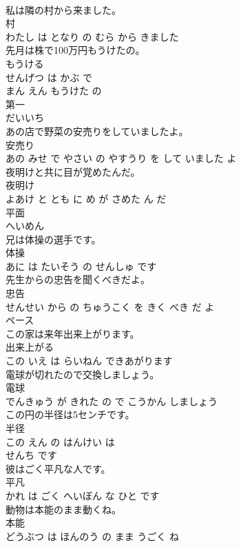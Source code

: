 \documentclass[8pt]{extreport}
\begin{document}
\begin{CJK}{UTF8}{min}
\\	私は隣の村から来ました。	
\\	村 
\\	わたし は となり の むら から きました			
\\	先月は株で100万円もうけたの。	
\\	もうける 
\\	せんげつ は かぶ で 
\\	まん えん もうけた の			
\\	第一	
\\	だいいち			
\\	あの店で野菜の安売りをしていましたよ。	
\\	安売り 
\\	あの みせ で やさい の やすうり を して いました よ			
\\	夜明けと共に目が覚めたんだ。	
\\	夜明け 
\\	よあけ と とも に め が さめた ん だ			
\\	平面	
\\	へいめん			
\\	兄は体操の選手です。	
\\	体操 
\\	あに は たいそう の せんしゅ です			
\\	先生からの忠告を聞くべきだよ。	
\\	忠告 
\\	せんせい から の ちゅうこく を きく べき だ よ			
\\	ペース	
\\	この家は来年出来上がります。	
\\	出来上がる 
\\	この いえ は らいねん できあがります			
\\	電球が切れたので交換しましょう。	
\\	電球 
\\	でんきゅう が きれた の で こうかん しましょう			
\\	この円の半径は5センチです。	
\\	半径 
\\	この えん の はんけい は 
\\	せんち です			
\\	彼はごく平凡な人です。	
\\	平凡 
\\	かれ は ごく へいぼん な ひと です			
\\	動物は本能のまま動くね。	
\\	本能 
\\	どうぶつ は ほんのう の まま うごく ね			

\end{CJK}
\end{document}
